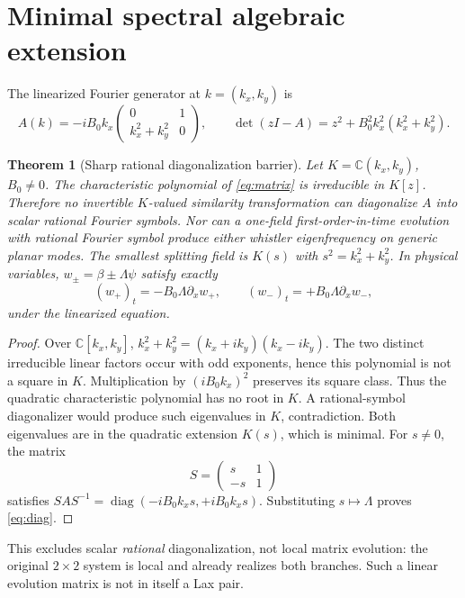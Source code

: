 \documentclass[11pt,a4paper]{article}
\newtheorem{theorem}{Theorem}
\begin{document}
\section{Minimal spectral algebraic extension}
The linearized Fourier generator at \(k=(k_x,k_y)\) is
\begin{equation}\label{eq:matrix}
 A(k)=-iB_0k_x
 \begin{pmatrix}0&1\\k_x^2+k_y^2&0\end{pmatrix},\qquad
 \det(zI-A)=z^2+B_0^2k_x^2(k_x^2+k_y^2).
\end{equation}
\begin{theorem}[Sharp rational diagonalization barrier]\label{thm:barrier}
Let \(K=\mathbb C(k_x,k_y)\), \(B_0\ne0\).
The characteristic polynomial of \eqref{eq:matrix} is irreducible in \(K[z]\). Therefore no invertible \(K\)-valued similarity transformation can diagonalize \(A\) into scalar rational Fourier symbols. Nor can a one-field first-order-in-time evolution with rational Fourier symbol produce either whistler eigenfrequency on generic planar modes. The smallest splitting field is \(K(s)\) with \(s^2=k_x^2+k_y^2\). In physical variables, \(w_\pm=\beta\pm\Lambda\psi\) satisfy exactly
\begin{equation}\label{eq:diag}
 (w_+)_t=-B_0\Lambda\partial_xw_+,\qquad
 (w_-)_t=+B_0\Lambda\partial_xw_-,
\end{equation}
under the linearized equation.
\end{theorem}
\begin{proof}
Over \(\mathbb C[k_x,k_y]\),
\(k_x^2+k_y^2=(k_x+ik_y)(k_x-ik_y)\).
The two distinct irreducible linear factors occur with odd exponents, hence this polynomial is not a square in \(K\). Multiplication by \((iB_0k_x)^2\) preserves its square class. Thus the quadratic characteristic polynomial has no root in \(K\). A rational-symbol diagonalizer would produce such eigenvalues in \(K\), contradiction. Both eigenvalues are in the quadratic extension \(K(s)\), which is minimal. For \(s\ne0\), the matrix
\[
 S=\begin{pmatrix}s&1\\-s&1\end{pmatrix}
\]
satisfies \(SAS^{-1}=\operatorname{diag}(-iB_0k_xs,+iB_0k_xs)\). Substituting \(s\mapsto\Lambda\) proves \eqref{eq:diag}.
\end{proof}
This excludes scalar \emph{rational} diagonalization, not local matrix evolution: the original \(2\times2\) system is local and already realizes both branches. Such a linear evolution matrix is not in itself a Lax pair.
\end{document}
